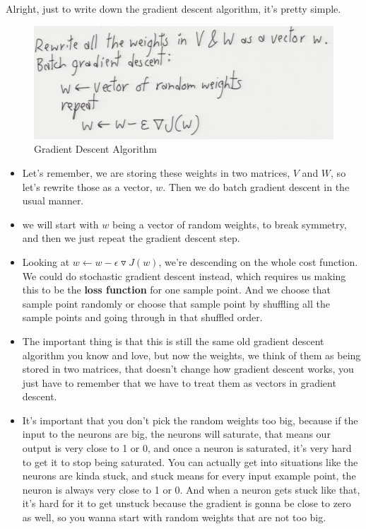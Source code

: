 \documentclass[fleqn,10pt]{olplainarticle}
\theoremstyle{definition}
\theoremstyle{remark}
\begin{document}
Alright, just to write down the gradient descent algorithm, it's pretty simple.
\begin{figure}[ht]
\centering
\includegraphics[width=0.7\linewidth]{images/gradient_descent}
\caption{Gradient Descent Algorithm}
\label{fig:gradient_descent}
\end{figure}

\begin{itemize}
\item Let's remember, we are storing these weights in two matrices, $V$ and $W$, so let's rewrite those as a vector, $w$. Then we do batch gradient descent in the usual manner.
\item we will start with $w$ being a vector of random weights, to break symmetry, and then we just repeat the gradient descent step.
\item Looking at $w \leftarrow w - \epsilon \triangledown J(w)$, we're descending on the whole cost function. We could do stochastic gradient descent instead, which requires us making this to be the \textbf{loss function} for one sample point. And we choose that sample point randomly or choose that sample point by shuffling all the sample points and going through in that shuffled order.
\item The important thing is that this is still the same old gradient descent algorithm you know and love, but now the weights, we think of them as being stored in two matrices, that doesn't change how gradient descent works, you just have to remember that we have to treat them as vectors in gradient descent.
\item It's important that you don't pick the random weights too big, because if the input to the neurons are big, the neurons will saturate, that means our output is very close to 1 or 0, and once a neuron is saturated, it's very hard to get it to stop being saturated. You can actually get into situations like the neurons are kinda stuck, and stuck means for every input example point, the neuron is always very close to 1 or 0. And when a neuron gets stuck like that, it's hard for it to get unstuck because the gradient is gonna be close to zero as well, so you wanna start with random weights that are not too big. 
\end{itemize}
\end{document}
